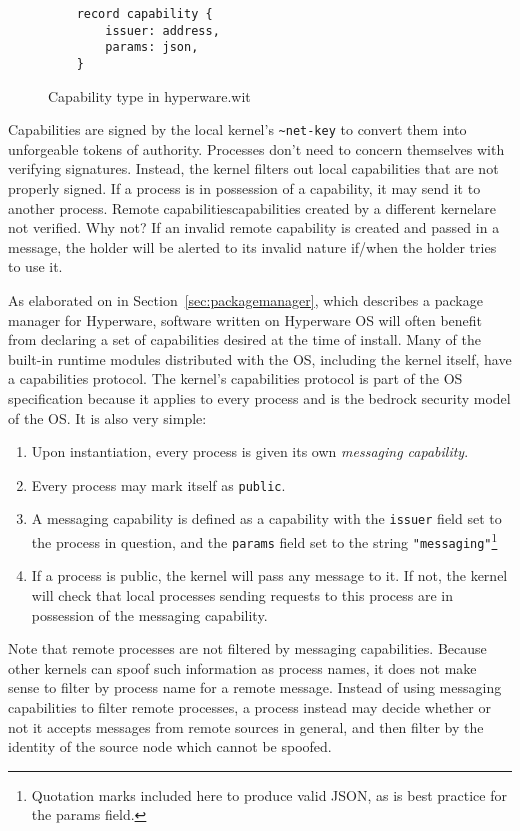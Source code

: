 \documentclass[runningheads]{llncs}
\begin{document}
\begin{figure}[H]
    \centering
    \begin{verbatim}
    record capability {
        issuer: address,
        params: json,
    }
    \end{verbatim}
    \caption{Capability type in hyperware.wit}
    \label{fig:WIT Types 3}
\end{figure}

Capabilities are signed by the local kernel's \verb|~net-key| to convert them into unforgeable tokens of authority.
Processes don't need to concern themselves with verifying signatures.
Instead, the kernel filters out local capabilities that are not properly signed.
If a process is in possession of a capability, it may send it to another process.
Remote capabilities\textemdash capabilities created by a different kernel\textemdash are not verified.
Why not?
If an invalid remote capability is created and passed in a message, the holder will be alerted to its invalid nature if/when the holder tries to use it.

As elaborated on in Section~\ref{sec:packagemanager}, which describes a package manager for Hyperware, software written on Hyperware OS will often benefit from declaring a set of capabilities desired at the time of install.
Many of the built-in runtime modules distributed with the OS, including the kernel itself, have a capabilities protocol.
The kernel's capabilities protocol is part of the OS specification because it applies to every process and is the bedrock security model of the OS.
It is also very simple:
\begin{enumerate}
    \item Upon instantiation, every process is given its own \textit{messaging capability}.
    \item Every process may mark itself as \verb|public|.
    \item A messaging capability is defined as a capability with the \verb|issuer| field set to the process in question, and the \verb|params| field set to the string \verb|"messaging"|\footnote{Quotation marks included here to produce valid JSON, as is best practice for the params field.}
    \item If a process is public, the kernel will pass any message to it. If not, the kernel will check that local processes sending requests to this process are in possession of the messaging capability.
\end{enumerate}

Note that remote processes are not filtered by messaging capabilities.
Because other kernels can spoof such information as process names, it does not make sense to filter by process name for a remote message.
Instead of using messaging capabilities to filter remote processes, a process instead may decide whether or not it accepts messages from remote sources in general, and then filter by the identity of the source node which cannot be spoofed.
\end{document}
